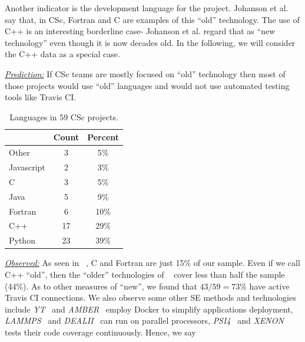 \documentclass[conference,10pt]{IEEEtran}
\begin{document}
Another indicator is the development language for the project. 
Johanson et al.~\cite{johan18_secs} say that, in CSc, Fortran and C are examples of this ``old'' technology. The use of C++ is an interesting borderline case- Johanson et al. regard that as ``new technology'' even though it is now decades old. In the following, we will consider the C++ data as a special case.




\noindent \textit{\underline{Prediction:}} If CSc teams are mostly focused on ``old'' technology then most of those projects would use ``old'' languages and would not use automated testing
tools like  Travis CI.


\begin{table}
\vspace{-15pt}
\caption{Languages in 59 CSc projects.  
}\label{tbl:language}
\vspace{-12pt}
 \footnotesize
 \hspace{-3pt}\begin{tabular}{l|c|c}
 \multicolumn{1}{c|}{} & \multicolumn{1}{c|}{Count} & \multicolumn{1}{c}{Percent}\\
\hline
Other & 3 &  5\%  \\ 
Javascript	& 2 & 3\% \\ 
C &	3 & 5\% \\ 
Java	& 5 & 9\% \\ 
Fortran	& 6 & 10\% \\
C++	& 17 & 29\% \\
Python & 23 & 39\% 
\end{tabular}
\vspace{-10pt}
\end{table} \noindent\textit{\underline{Observed:}} 
As seen in ~, C and Fortran are just 15\% of our sample.
Even if we call C++ ``old'', then the ``older'' technologies of ~
cover less than half the sample (44\%).
As to other measures of ``new'', we found that  $43/59=73\%$
have active
Travis CI connections. We also observe some other SE methods and technologies include \textit{YT}~\cite{yt_project} and  \textit{AMBER}~\cite{Amber-MD} employ Docker to simplify applications deployment,  \textit{LAMMPS}~\cite{lammps-sandia} and \textit{DEALII}~\cite{BangerthHartmannKanschat2007} can run on parallel processors, \textit{PSI4}~\cite{psi4} and \textit{XENON}~\cite{xenon} tests their code coverage continuously.   Hence, we say
\end{document}
